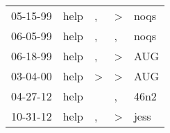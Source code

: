 \begin{supertabular}{p{0.07\textwidth}p{0.06\textwidth}p{0.02\textwidth}p{0.02\textwidth}p{0.06\textwidth}}
 05-15-99\textsuperscript{} &  help\textsuperscript{} &             , &  \textgreater &  noqs\textsuperscript{} \\
 06-05-99\textsuperscript{} &  help\textsuperscript{} &             , &             , &  noqs\textsuperscript{} \\
 06-18-99\textsuperscript{} &  help\textsuperscript{} &             , &  \textgreater &   AUG\textsuperscript{} \\
 03-04-00\textsuperscript{} &  help\textsuperscript{} &  \textgreater &  \textgreater &   AUG\textsuperscript{} \\
 04-27-12\textsuperscript{} &  help\textsuperscript{} &               &             , &  46n2\textsuperscript{} \\
 10-31-12\textsuperscript{} &  help\textsuperscript{} &             , &  \textgreater &  jess\textsuperscript{} \\
\end{supertabular}
